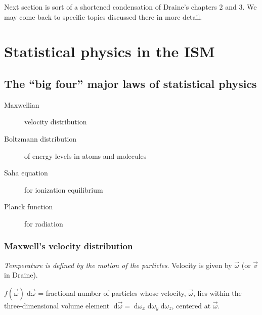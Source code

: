 \documentclass[11pt]{article}
\newcommand{\mar}[1]{\hspace{0pt}\marginpar{-\textcolor{black}{#1}-}}
\newcommand{\mynotes}[1]{{\fontfamily{cmss}\selectfont \textit{#1}}}
\let\oldsection\section
\renewcommand\section{\clearpage\oldsection}
\begin{document}
\mar{16}Next section is sort of a shortened condensation of Draine's chapters 2
and 3. We may come back to specific topics discussed there in more detail.

\newpage
\section{Statistical physics in the ISM}
\subsection{The ``big four'' major laws of statistical physics}
\begin{description}
    \item [Maxwellian] velocity distribution
    \item [Boltzmann distribution] of energy levels in atoms and molecules
    \item [Saha equation] for ionization equilibrium
    \item [Planck function] for radiation
\end{description}

\subsubsection{Maxwell's velocity distribution}
\mynotes{Temperature is defined by the motion of the particles}.
Velocity is given by $\vec{\omega}$ (or $\vec{v}$ in Draine).

$f(\vec{\omega})\;\mathrm{d}\vec{\omega}$ =
fractional number of particles whose velocity, $\vec{\omega}$, lies within the
three-dimensional volume element
$\;\mathrm{d}\vec{\omega} =
\;\mathrm{d}\omega_{x}\;\mathrm{d}\omega_{y}\;\mathrm{d}\omega_{z}$,
centered at $\vec{\omega}$.
\end{document}
